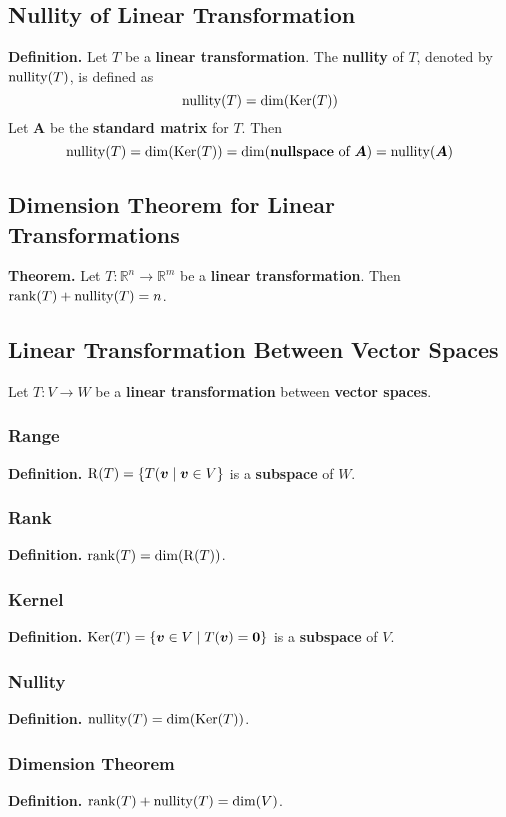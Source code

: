 \documentclass[../ma2001_notes.tex]{subfiles}
\begin{document}
\subsection{Nullity of Linear Transformation}
\textbf{Definition.} Let \(T\) be a \textbf{linear transformation}. The \textbf{nullity} of \(T\), denoted by \(\operatorname{nullity}(T)\), is defined as
\[\operatorname{nullity}(T)=\dim(\operatorname{Ker}(T))\]
Let \(\bm{A}\) be the \textbf{standard matrix} for \(T\). Then
\[\operatorname{nullity}(T)=\dim(\operatorname{Ker}(T))=\dim(\textbf{nullspace}\text{ of }\bm{A})=\operatorname{nullity}(\bm{A})\]

\subsection{Dimension Theorem for Linear Transformations}
\textbf{Theorem.} Let \(T:\mathbb{R}^n\to\mathbb{R}^m\) be a \textbf{linear transformation}. Then \(\operatorname{rank}(T)+\operatorname{nullity}(T)=n\).

\subsection{Linear Transformation Between Vector Spaces}
Let \(T:V\to W\) be a \textbf{linear transformation} between \textbf{vector spaces}.

\subsubsection{Range}
\textbf{Definition.} \(\operatorname{R}(T)=\{T(\bm{v}\mid\bm{v}\in V\}\) is a \textbf{subspace} of \(W\).

\subsubsection{Rank}
\textbf{Definition.} \(\operatorname{rank}(T)=\dim(\operatorname{R}(T))\).

\subsubsection{Kernel}
\textbf{Definition.} \(\operatorname{Ker}(T)=\{\bm{v}\in V\mid T(\bm{v})=\bm{0}\}\) is a \textbf{subspace} of \(V\).

\subsubsection{Nullity}
\textbf{Definition.} \(\operatorname{nullity}(T)=\dim(\operatorname{Ker}(T))\).

\subsubsection{Dimension Theorem}
\textbf{Definition.} \(\operatorname{rank}(T)+\operatorname{nullity}(T)=\dim(V)\).
\end{document}
